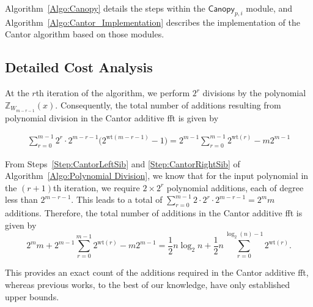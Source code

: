 Algorithm~\ref{Algo:Canopy} details the steps within the \(\mathsf{Canopy}_{p, i}\) module, and Algorithm~\ref{Algo:Cantor_Implementation} describes the implementation of the Cantor algorithm based on those modules. 

\subsection{Detailed Cost Analysis}
At the $r$th iteration of the algorithm, we perform $2^{r}$ divisions by the polynomial $\mathbb{Z}_{W_{m-r-1}}(x)$. Consequently, the total number of additions resulting from polynomial division in the Cantor additive \gls{fft} is given by

\begin{equation*}
	\begin{aligned}
		\displaystyle{\sum_{r=0}^{m-1} 2^r \cdot 2^{m-r-1} \big( 2^{\text{wt}(m-r-1)}-1 \big) }
		= 2^{m-1} \displaystyle{\sum_{r=0}^{m-1} 2^{\text{wt}(r)} } - m2^{m-1}
	\end{aligned}
\end{equation*}

From Steps~\ref{Step:CantorLeftSib} and \ref{Step:CantorRightSib} of Algorithm~\ref{Algo:Polynomial Division}, we know that for the input polynomial in the $(r+1)$th iteration, we require $2 \times 2^r$ polynomial additions, each of degree less than $2^{m-r-1}$. This leads to a total of  $\sum_{r=0}^{m-1} 2\cdot 2^{r} \cdot 2^{m-r-1}=2^m m$ additions. Therefore, the total number of additions in the Cantor additive \gls{fft} is given by \[2^m m + 2^{m-1} \displaystyle{\sum_{r=0}^{m-1} 2^{\text{wt}(r)} } - m2^{m-1}= \frac{1}{2} n\log_2 n + \frac{1}{2}n \sum_{r=0}^{\log_2(n)-1} 2^{\text{wt}(r)}.\]


This provides an exact count of the additions required in the Cantor additive \gls{fft}, whereas previous works, to the best of our knowledge, have only established upper bounds.

